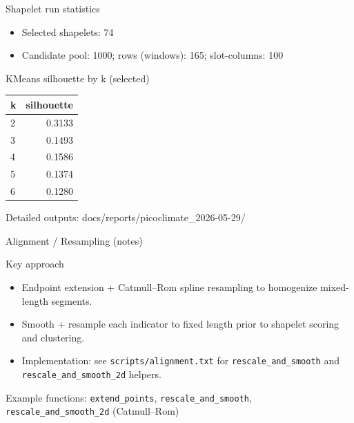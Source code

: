 \documentclass[aspectratio=169]{beamer}
\begin{document}
\begin{frame}{Shapelet run statistics}
\begin{itemize}
  \item Selected shapelets: 74
  \item Candidate pool: 1000; rows (windows): 165; slot-columns: 100
\end{itemize}
\vspace{6pt}
\begin{block}{KMeans silhouette by k (selected)}
\begin{tabular}{lr}
\toprule
k & silhouette \\
\midrule
2 & 0.3133 \\
3 & 0.1493 \\
4 & 0.1586 \\
5 & 0.1374 \\
6 & 0.1280 \\
\bottomrule
\end{tabular}
\end{block}
\vspace{6pt}
\footnotesize Detailed outputs: docs/reports/picoclimate_2026-05-29/
\end{frame}

\begin{frame}{Alignment / Resampling (notes)}
\begin{block}{Key approach}
\begin{itemize}
  \item Endpoint extension + Catmull--Rom spline resampling to homogenize mixed-length segments.
  \item Smooth + resample each indicator to fixed length prior to shapelet scoring and clustering.
  \item Implementation: see \texttt{scripts/alignment.txt} for \texttt{rescale\_and\_smooth} and \texttt{rescale\_and\_smooth\_2d} helpers.
\end{itemize}
\end{block}
\vspace{6pt}
\begin{tcolorbox}[colback=clight,colframe=cmid]
\footnotesize Example functions: \texttt{extend\_points}, \texttt{rescale\_and\_smooth}, \texttt{rescale\_and\_smooth\_2d} (Catmull--Rom)
\end{tcolorbox}
\end{frame}
\end{document}
